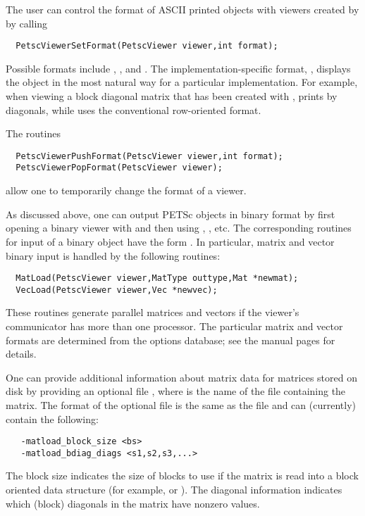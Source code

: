 The user can control the format of ASCII printed objects with viewers 
created by  by calling
\begin{verbatim}
  PetscViewerSetFormat(PetscViewer viewer,int format);
\end{verbatim}  
  
 
Possible formats include 
, , and
\break {}.  The implementation-specific format, 
, displays the object in the most natural way
for a particular implementation.  For example, when viewing a block 
diagonal matrix that has been created with ,
 prints by diagonals, while 
uses the conventional row-oriented format.

The routines
\begin{verbatim}
  PetscViewerPushFormat(PetscViewer viewer,int format);
  PetscViewerPopFormat(PetscViewer viewer);
\end{verbatim} 
allow one to temporarily change the format of a viewer.
 

As discussed above, one can output PETSc objects in binary format by
first opening a binary viewer with  and
then using , , etc.  The corresponding
routines for input of a binary object have the form .  In
particular, matrix and vector binary input is handled by the
following routines:  
\begin{verbatim}
  MatLoad(PetscViewer viewer,MatType outtype,Mat *newmat);
  VecLoad(PetscViewer viewer,Vec *newvec);
\end{verbatim}
These routines generate parallel matrices and vectors if the viewer's
communicator has more than one processor.  The particular matrix and
vector formats are determined from the options database; see the
manual pages for details.

One can provide additional information about matrix data for matrices
stored on disk by providing an optional file ,
where  is the name of the file containing the matrix.
The format of the optional file is the same as the  file 
and can (currently) contain the following:
\begin{verbatim}
   -matload_block_size <bs>
   -matload_bdiag_diags <s1,s2,s3,...>
\end{verbatim}
The block size indicates the size of blocks to use if the matrix is
read into a block oriented data structure (for example, 
 or ). The diagonal information 
 indicates
which (block) diagonals in the matrix have nonzero values.

